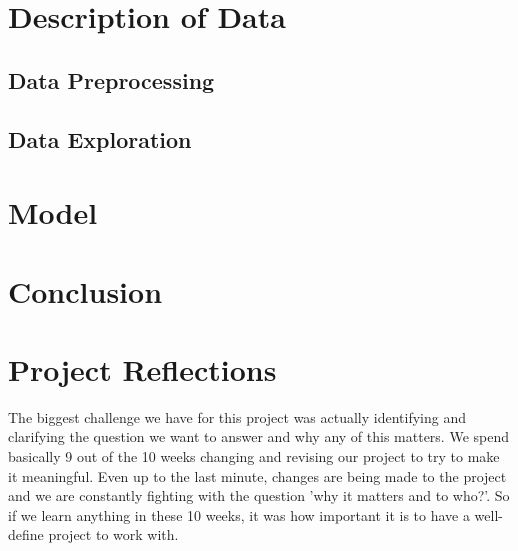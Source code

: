 \documentclass[12pt]{article}
\begin{document}


\section{Description of Data} \label{sec:Descript} 

\subsection{Data Preprocessing}


\subsection{Data Exploration}


\section{Model} \label{sec:Model}



\section{Conclusion} \label{sec:Conclusion}

\section{Project Reflections} \label{sec:Reflections}
The biggest challenge we have for this project was actually identifying and clarifying the question we want to answer and why any of this matters. We spend basically 9 out of the 10 weeks changing and revising our project to try to make it meaningful. Even up to the last minute, changes are being made to the project and we are constantly fighting with the question 'why it matters and to who?'. So if we learn anything in these 10 weeks, it was how important it is to have a well-define project to work with.  
\end{document}
